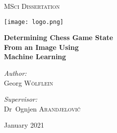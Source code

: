 \begin{titlepage}
	\centering
	
	{\scshape\LARGE MSci Dissertation\par}
	\vspace{0.25cm}
	{\texttt{[image: logo.png]} \par}
	\vspace{0.25cm}
	{\huge\bfseries Determining Chess Game State\\From an Image Using\\Machine Learning\par}
	\vspace{0.5cm}

	\vfill

	\noindent
	\begin{minipage}{0.45\textwidth}
		\begin{center} \large
		  \textit{Author:}\\
          Georg \textsc{Wölflein}\\
		\end{center}
    \end{minipage}%
    \begin{minipage}{0.45\textwidth}
		\begin{center} \large
		\textit{Supervisor:} \\
		Dr~Ognjen \textsc{Arandjelović}
		\end{center}
	\end{minipage}%

	\vfill

	{January 2021\par}
\end{titlepage}
